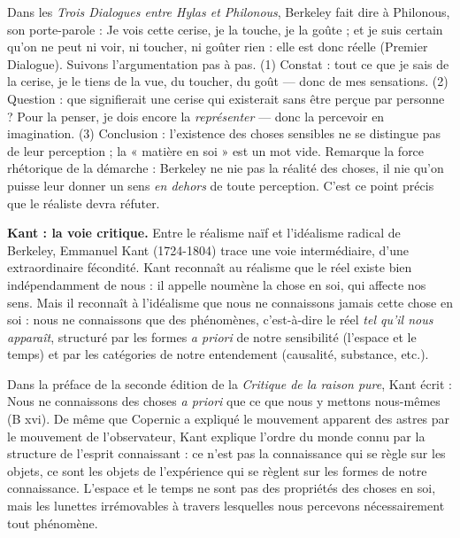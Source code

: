 \documentclass[11pt]{article}
\newcommand{\cle}[1]{{\popxbold\color{popdark}#1}}
\begin{document}
\begin{experience}
Dans les \emph{Trois Dialogues entre Hylas et Philonous}, Berkeley fait dire à Philonous, son porte-parole : \guillemotleft Je vois cette cerise, je la touche, je la goûte ; et je suis certain qu'on ne peut ni voir, ni toucher, ni goûter rien : elle est donc réelle \guillemotright (Premier Dialogue). Suivons l'argumentation pas à pas. (1) Constat : tout ce que je sais de la cerise, je le tiens de la vue, du toucher, du goût — donc de mes sensations. (2) Question : que signifierait une cerise qui existerait sans être perçue par personne ? Pour la penser, je dois encore la \emph{représenter} — donc la percevoir en imagination. (3) Conclusion : l'existence des choses sensibles ne se distingue pas de leur perception ; la « matière en soi » est un mot vide. Remarque la force rhétorique de la démarche : Berkeley ne nie pas la réalité des choses, il nie qu'on puisse leur donner un sens \emph{en dehors} de toute perception. C'est ce point précis que le réaliste devra réfuter.
\end{experience}

\textbf{Kant : la voie critique.} Entre le réalisme naïf et l'idéalisme radical de Berkeley, Emmanuel Kant (1724-1804) trace une voie intermédiaire, d'une extraordinaire fécondité. Kant reconnaît au réalisme que le réel existe bien indépendamment de nous : il appelle \cle{noumène} la chose en soi, qui affecte nos sens. Mais il reconnaît à l'idéalisme que nous ne connaissons jamais cette chose en soi : nous ne connaissons que des \cle{phénomènes}, c'est-à-dire le réel \emph{tel qu'il nous apparaît}, structuré par les formes \emph{a priori} de notre sensibilité (l'espace et le temps) et par les catégories de notre entendement (causalité, substance, etc.).

\begin{propriete}
Dans la préface de la seconde édition de la \emph{Critique de la raison pure}, Kant écrit : \guillemotleft Nous ne connaissons des choses \emph{a priori} que ce que nous y mettons nous-mêmes \guillemotright (B xvi). De même que Copernic a expliqué le mouvement apparent des astres par le mouvement de l'observateur, Kant explique l'ordre du monde connu par la structure de l'esprit connaissant : ce n'est pas la connaissance qui se règle sur les objets, ce sont les objets de l'expérience qui se règlent sur les formes de notre connaissance. L'espace et le temps ne sont pas des propriétés des choses en soi, mais les lunettes irrémovables à travers lesquelles nous percevons nécessairement tout phénomène.
\end{propriete}
\end{document}
